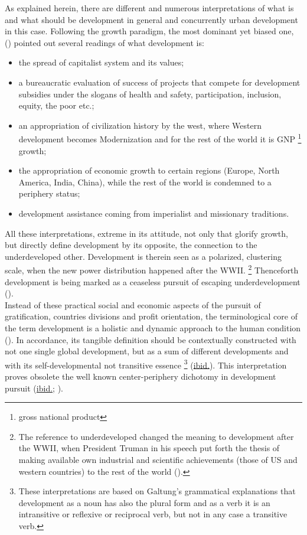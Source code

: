 \documentclass[11pt]{report}
\begin{document}
As explained herein, there are different and numerous interpretations of what is and what should be development in general and concurrently urban development in this case.
Following the growth paradigm, the most dominant yet biased one, (\href{Galtung}{\citealt{galtung_peace_1996}}) pointed out several readings of what development is:

\begin{itemize}
\item the spread of capitalist system and its values;
\item a bureaucratic evaluation of success of projects that compete for development subsidies under the slogans of health and safety, participation, inclusion, equity, the poor etc.;
\item an appropriation of civilization history by the west, where Western development becomes Modernization and for the rest of the world it is GNP
\footnote{gross national product}
growth; 
\item the appropriation of economic growth to certain regions (Europe, North America, India, China), while the rest of the world is condemned to a periphery status;
\item development assistance coming from imperialist and missionary traditions.
\end{itemize}

All these interpretations, extreme in its attitude, not only that glorify growth, but directly define development by its opposite, the connection to the underdeveloped other.
Development is therein seen as a polarized, clustering scale, when the new power distribution happened after the WWII.
\footnote{The reference to underdeveloped changed the meaning to development after the WWII, when President Truman in his speech put forth the thesis of making available own industrial and scientific achievements (those of US and western countries) to the rest of the world (\href{Esteva}{\citealt{esteva_development_2010}}).}
Thenceforth development is being marked as a ceaseless pursuit of escaping underdevelopment (\href{Esteva}{\citealt{esteva_development_2010}}).
\\

Instead of these practical social and economic aspects of the pursuit of gratification, countries divisions and profit orientation, the terminological core of the term development is a holistic and dynamic approach to the human condition (\href{Galtung}{\citealt{galtung_peace_1996}}). 
In accordance, its tangible definition should be contextually constructed with not one single global development, but as a sum of different developments and with its self-developmental not transitive essence
\footnote{These interpretations are based on Galtung's grammatical explanations that development as a noun has also the plural form and as a verb it is an intransitive or reflexive or reciprocal verb, but not in any case a transitive verb.}
(\href{Galtung}{ibid.}).
This interpretation proves obsolete the well known center-periphery dichotomy in development pursuit (\href{Galtung}{ibid.}; \href{Robinson}{\citealt{robinson_ordinary_2006}}).
\\
\end{document}
